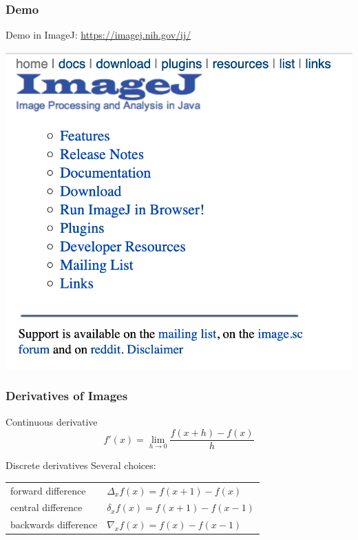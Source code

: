 \begin{frame}
    \frametitle{Demo}
    Demo in ImageJ: \url{https://imagej.nih.gov/ij/}
    \begin{center}
    	\includegraphics[height=0.75\textheight]{images/imageJ_webpage.png}
    \end{center}
\end{frame}


\begin{frame}
    \frametitle{Derivatives of Images}
    \begin{block}{Continuous derivative}
        \begin{equation*}
            f'(x) = \lim_{h\rightarrow0}\frac{f(x+h)-f(x)}{h}
        \end{equation*}
    \end{block}
    \begin{block}{Discrete derivatives}
        Several choices:

        \begin{center}
            \begin{tabularx}{0.8\textwidth}{lX}
                forward difference                    & $\Delta_x f(x) = f(x+1) - f(x)$   \\
                \rule{0pt}{1.5em}central difference   & $\delta_x f(x) = f(x+1) - f(x-1)$ \\
                \rule{0pt}{1.5em}backwards difference & $\nabla_x f(x) = f(x) - f(x-1)$
            \end{tabularx}
        \end{center}
    \end{block}
\end{frame}

